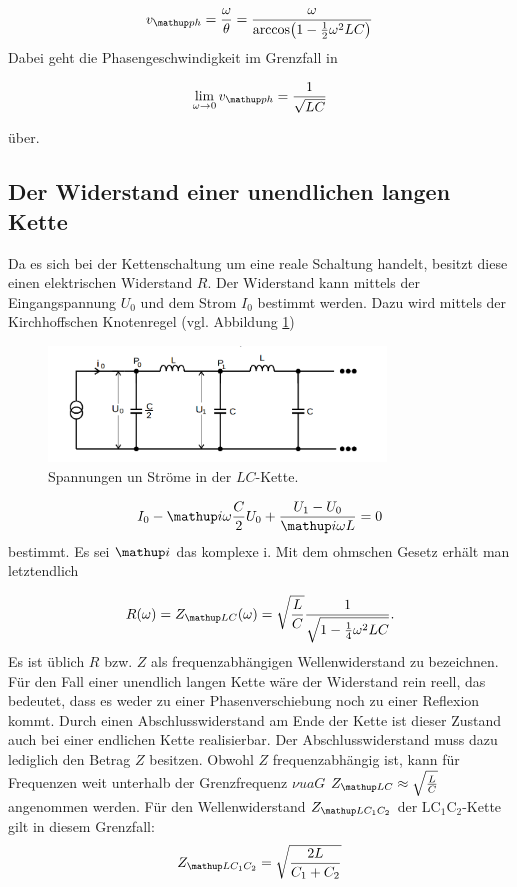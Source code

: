 \begin{equation}
\label{eq:phasen_esc}
v\ua{ph}=\frac{\omega}{\theta}=\frac{\omega}{\arccos\!\left(1-\frac{1}{2}\omega^2LC\right)}
\end{equation}
Dabei geht die Phasengeschwindigkeit im Grenzfall in

\begin{equation*}
\lim_{\omega\to 0}v\ua{ph}=\frac{1}{\sqrt{LC}}
\end{equation*}

über.
\subsection{Der Widerstand einer unendlichen langen Kette}
Da es sich bei der Kettenschaltung um eine reale Schaltung handelt,
besitzt diese einen elektrischen Widerstand $R$.
Der Widerstand kann mittels der Eingangspannung $U_0$ und dem Strom $I_0$ bestimmt werden.
Dazu wird mittels der Kirchhoffschen Knotenregel (vgl. Abbildung \ref{fig:bestimmung_impe}) %
\begin{figure}
  \centering
  \includegraphics[width=0.8\textwidth]{bilder/eigenimpendanz.png}
  \caption{Spannungen un Ströme in der $LC$-Kette.\cite{anleitung356}}
  \label{fig:bestimmung_impe}
\end{figure}
\begin{equation*}
I_0 - \map{i}\omega\frac{C}{2}U_0+\frac{U_1-U_0}{\map{i}\omega L}=0
\end{equation*}
bestimmt.
Es sei $\map{i}$ das komplexe i. %
Mit dem ohmschen Gesetz erhält man letztendlich %

\begin{equation}
R(\omega)=Z\ua{LC}(\omega)=\sqrt{\frac{L}{C}}\frac{1}{\sqrt{1-\frac{1}{4}\omega^2LC}}.
\label{eq: wellenwiderstand_LC}
\end{equation}
Es ist üblich $R$ bzw. $Z$ als frequenzabhängigen Wellenwiderstand zu bezeichnen.
Für den Fall einer unendlich langen Kette wäre der Widerstand rein reell, das bedeutet, %
dass es weder zu einer Phasenverschiebung noch zu einer Reflexion kommt.
Durch einen Abschlusswiderstand am Ende der Kette ist dieser Zustand auch bei einer endlichen Kette
realisierbar. Der Abschlusswiderstand muss dazu lediglich den Betrag $Z$ besitzen.
Obwohl $Z$ frequenzabhängig ist, kann für Frequenzen weit unterhalb der Grenzfrequenz $\nu{ua{G}}$
$Z\ua{LC}\approx \sqrt{\frac{L}{C}}$ angenommen werden. Für den Wellenwiderstand $Z\ua{LC_1C_2}$ der $\mathup{LC_1C_2}$-Kette gilt
in diesem Grenzfall:
\begin{equation}
  Z\ua{LC_1C_2} = \sqrt{\frac{2L}{C_1 + C_2}}
  \label{eq: Z_LC_1C_2}
\end{equation}

